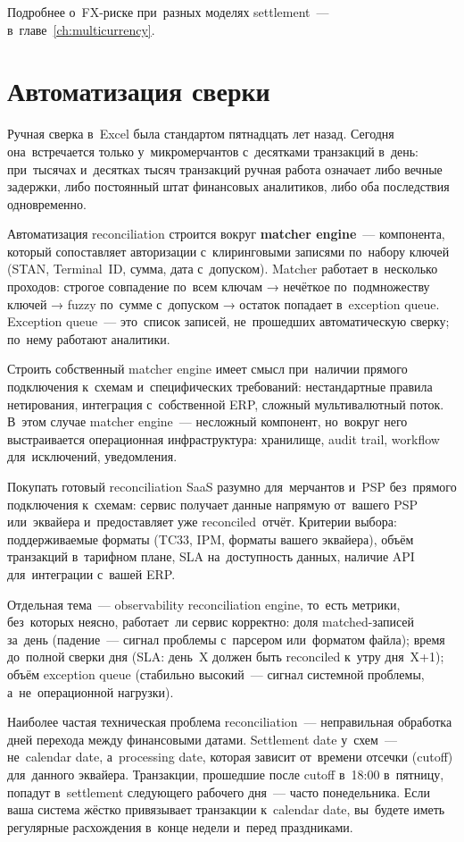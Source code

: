 Подробнее о~FX-риске при~разных моделях settlement~--- в~главе~\ref{ch:multicurrency}.


\section{Автоматизация сверки}
\label{sec:recon-automation}

Ручная сверка в~Excel была стандартом пятнадцать лет назад. Сегодня
она~встречается только у~микромерчантов с~десятками транзакций в~день:
при~тысячах и~десятках тысяч транзакций ручная работа означает либо
вечные задержки, либо постоянный штат финансовых аналитиков, либо
оба последствия одновременно.

Автоматизация reconciliation строится вокруг \textbf{matcher engine}~---
компонента, который сопоставляет авторизации с~клиринговыми записями
по~набору ключей (STAN, Terminal~ID, сумма, дата с~допуском). Matcher
работает в~несколько проходов: строгое совпадение по~всем ключам → нечёткое
по~подмножеству ключей → fuzzy по~сумме с~допуском → остаток попадает
в~exception queue. Exception queue~--- это~список записей, не~прошедших
автоматическую сверку; по~нему работают аналитики.

Строить собственный matcher engine имеет смысл при~наличии прямого
подключения к~схемам и~специфических требований: нестандартные правила
нетирования, интеграция с~собственной ERP, сложный мультивалютный поток.
В~этом случае matcher engine~--- несложный компонент, но~вокруг него
выстраивается операционная инфраструктура: хранилище, audit trail,
workflow для~исключений, уведомления.

Покупать готовый reconciliation SaaS разумно
для~мерчантов и~PSP без~прямого подключения к~схемам: сервис получает
данные напрямую от~вашего PSP или~эквайера и~предоставляет уже
reconciled~отчёт. Критерии выбора: поддерживаемые форматы (TC33, IPM,
форматы вашего эквайера), объём транзакций в~тарифном плане, SLA
на~доступность данных, наличие API для~интеграции с~вашей ERP.

Отдельная тема~--- observability reconciliation engine, то~есть метрики, без~которых
неясно, работает~ли сервис корректно: доля matched-записей за~день
(падение~--- сигнал проблемы с~парсером или~форматом файла); время
до~полной сверки дня (SLA: день~X должен быть reconciled к~утру дня~X+1);
объём exception queue (стабильно высокий~--- сигнал системной
проблемы, а~не~операционной нагрузки).

\begin{practice}
  Наиболее частая техническая проблема reconciliation~--- неправильная
  обработка дней перехода между финансовыми датами. Settlement date
  у~схем~--- не~calendar date, а~processing date, которая зависит от~времени
  отсечки (cutoff) для~данного эквайера. Транзакции, прошедшие после
  cutoff в~18:00 в~пятницу, попадут в~settlement следующего рабочего дня~---
  часто понедельника. Если ваша система жёстко привязывает транзакции
  к~calendar date, вы~будете иметь регулярные расхождения в~конце
  недели и~перед праздниками.
\end{practice}


